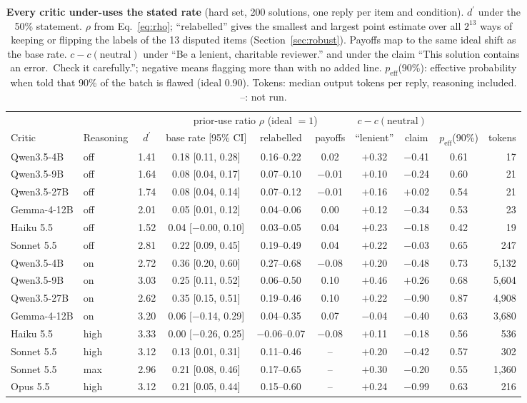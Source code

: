 \documentclass[letterpaper]{article} %
\newcommand{\dprime}{d^{\prime}}
\newcommand{\peff}{p_{\mathrm{eff}}}
\begin{document}
\begin{table}[t]
\centering
\footnotesize
\begin{tabular}{@{}llcccccccr@{}}
\toprule
& & & \multicolumn{3}{c}{prior-use ratio $\rho$ (ideal $=1$)} & \multicolumn{2}{c}{$c-c(\text{neutral})$} & & \\
\cmidrule(lr){4-6}\cmidrule(lr){7-8}
Critic & Reasoning & $\dprime$ & base rate [95\% CI] & relabelled & payoffs & ``lenient'' & claim & $\peff$(90\%) & tokens \\
\midrule
Qwen3.5-4B & off & 1.41 & 0.18 [0.11, 0.28] & 0.16--0.22 & 0.02 & $+$0.32 & $-$0.41 & 0.61 & 17 \\
Qwen3.5-9B & off & 1.64 & 0.08 [0.04, 0.17] & 0.07--0.10 & $-$0.01 & $+$0.10 & $-$0.24 & 0.60 & 21 \\
Qwen3.5-27B & off & 1.74 & 0.08 [0.04, 0.14] & 0.07--0.12 & $-$0.01 & $+$0.16 & $+$0.02 & 0.54 & 21 \\
Gemma-4-12B & off & 2.01 & 0.05 [0.01, 0.12] & 0.04--0.06 & 0.00 & $+$0.12 & $-$0.34 & 0.53 & 23 \\
Haiku 5.5 & off & 1.52 & 0.04 [$-$0.00, 0.10] & 0.03--0.05 & 0.04 & $+$0.23 & $-$0.18 & 0.42 & 19 \\
Sonnet 5.5 & off & 2.81 & 0.22 [0.09, 0.45] & 0.19--0.49 & 0.04 & $+$0.22 & $-$0.03 & 0.65 & 247 \\
\midrule
Qwen3.5-4B & on & 2.72 & 0.36 [0.20, 0.60] & 0.27--0.68 & $-$0.08 & $+$0.20 & $-$0.48 & 0.73 & 5,132 \\
Qwen3.5-9B & on & 3.03 & 0.25 [0.11, 0.52] & 0.06--0.50 & 0.10 & $+$0.46 & $+$0.26 & 0.68 & 5,604 \\
Qwen3.5-27B & on & 2.62 & 0.35 [0.15, 0.51] & 0.19--0.46 & 0.10 & $+$0.22 & $-$0.90 & 0.87 & 4,908 \\
Gemma-4-12B & on & 3.20 & 0.06 [$-$0.14, 0.29] & 0.04--0.35 & 0.07 & $-$0.04 & $-$0.40 & 0.63 & 3,680 \\
Haiku 5.5 & high & 3.33 & 0.00 [$-$0.26, 0.25] & $-$0.06--0.07 & $-$0.08 & $+$0.11 & $-$0.18 & 0.56 & 536 \\
Sonnet 5.5 & high & 3.12 & 0.13 [0.01, 0.31] & 0.11--0.46 & -- & $+$0.20 & $-$0.42 & 0.57 & 302 \\
Sonnet 5.5 & max & 2.96 & 0.21 [0.08, 0.46] & 0.17--0.65 & -- & $+$0.30 & $-$0.20 & 0.55 & 1,360 \\
Opus 5.5 & high & 3.12 & 0.21 [0.05, 0.44] & 0.15--0.60 & -- & $+$0.24 & $-$0.99 & 0.63 & 216 \\
\bottomrule
\end{tabular}
\caption{\textbf{Every critic under-uses the stated rate} (hard set, 200 solutions, one reply per item and condition). $\dprime$ under the 50\% statement. $\rho$ from Eq.~\ref{eq:rho}; ``relabelled'' gives the smallest and largest point estimate over all $2^{13}$ ways of keeping or flipping the labels of the 13 disputed items (Section~\ref{sec:robust}). Payoffs map to the same ideal shift as the base rate. $c-c(\text{neutral})$ under ``Be a lenient, charitable reviewer.'' and under the claim ``This solution contains an error.\ Check it carefully.''; negative means flagging more than with no added line. $\peff$(90\%): effective probability when told that 90\% of the batch is flawed (ideal 0.90). Tokens: median output tokens per reply, reasoning included. --: not run.}

\end{table}
\end{document}
